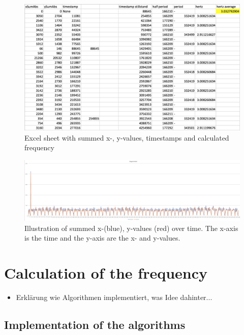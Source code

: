 \documentclass[12pt, a4paper]{report}
\begin{document}
    \noindent
    \begin{figure}[H]
    \centering
    \includegraphics[scale=0.45]{Images/excel_sheet_numbers.png}
    
    \caption{Excel sheet with summed x-, y-values, timestamps and calculated frequency}
    \end{figure}

    \noindent
    \begin{figure}[H]
    \centering
    \includegraphics[scale=0.35]{Images/excel_sheet_graph.png}
    
    \caption{Illustration of summed x-(blue), y-values (red) over time. The x-axis is the time and the y-axis are the x- and y-values.}
    \end{figure}
    
    \chapter{Calculation of the frequency}
    
    \begin{itemize}
    \item Erklärung wie Algorithmen implementiert, was Idee dahinter...
    \end{itemize}
    
    \section{Implementation of the algorithms}
\end{document}
